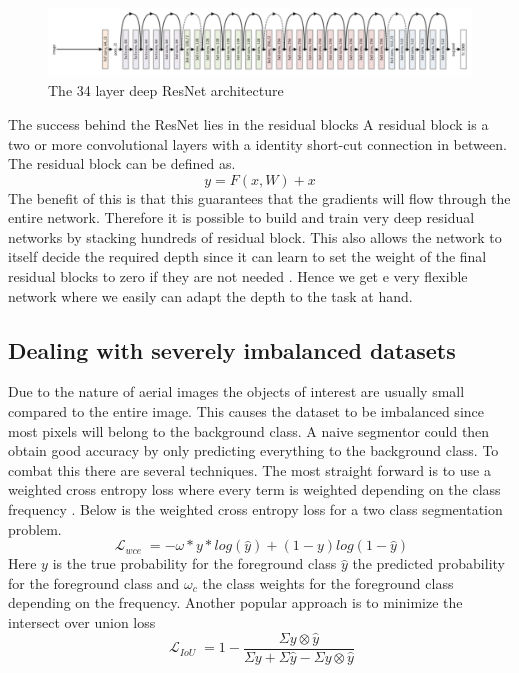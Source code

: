 \documentclass[a4paper,11pt]{article}
\DeclareMathOperator{\Lagr}{\mathcal{L}}
\begin{document}
\begin{figure}[h!]
  \centering
      \includegraphics[scale=0.25]{resnet}
  \caption{The 34 layer deep ResNet architecture \cite{simonyan_very_2014}} \label{fig:vgg}
\end{figure}
The success behind the ResNet lies in the residual blocks A residual block is a two or more convolutional layers with a identity short-cut connection in between. The residual block can be defined as.
\begin{equation}
y=F(x, W) + x
\end{equation}
The benefit of this is that this guarantees that the gradients will flow through the entire network. Therefore it is possible to build and train very deep residual networks by stacking hundreds of residual block. This also allows the network to itself decide the required depth since it can learn to set the weight of the final residual blocks to zero if they are not needed \cite{he_deep_2015}. Hence we get e very flexible network where we easily can adapt the depth to the task at hand.
\subsection{Dealing with severely imbalanced datasets}
Due to the nature of aerial images the objects of interest are usually small compared to the entire image. This causes the dataset to be imbalanced since most pixels will belong to the background class. A naive segmentor could then obtain good accuracy by only predicting everything to the background class. To combat this there are several techniques. The most straight forward is to use a weighted cross entropy loss where every term is weighted depending on the class frequency \cite{sudre_generalised_2017}. Below is the weighted cross entropy loss for a two class segmentation problem.
\begin{equation}
\Lagr_{wce}=-\omega*y*log(\hat{y}) + (1-y)log(1-\hat{y})
\end{equation}
Here $y$ is the true probability for the foreground class  $\hat{y}$ the predicted probability for the foreground class and $\omega_c$ the class weights for the foreground class depending on the frequency. Another popular approach is to minimize the intersect over union loss \cite{yu_unitbox:_2016, rahman_optimizing_2016}
\begin{equation}
\Lagr_{IoU}= 1 - \frac{ \Sigma y \otimes \hat{y} }{ \Sigma y + \Sigma \hat{y} - \Sigma y \otimes \hat{y}}
\end{equation}
\end{document}

